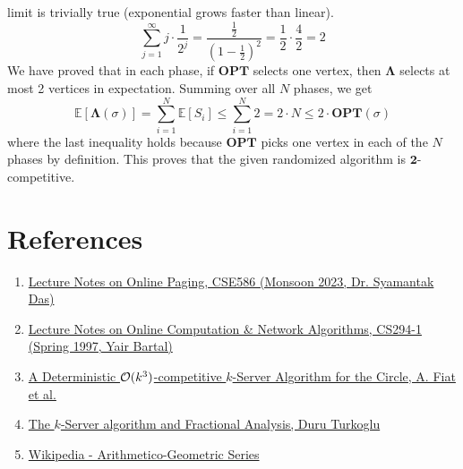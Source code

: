 \documentclass[11pt]{article}
\newcommand{\bigO}{{\cal O}}
\begin{document}
limit is trivially true (exponential grows faster than linear). \\
\begin{equation}
    \label{eq:ags}
    \sum_{j=1}^{\infty} j \cdot \frac{1}{2^{j}} = \frac{\frac{1}{2}}{(1 - \frac{1}{2})^{2}} = \frac{1}{2} \cdot \frac{4}{2} = 2
\end{equation}
We have proved that in each phase, if $\mathbf{OPT}$ selects one vertex, then $\mathbf{\Lambda}$ selects at most 2 vertices
in expectation. Summing over all $N$ phases, we get
\begin{equation}
    \mathbb{E}[\mathbf{\Lambda}(\sigma)] = \sum_{i=1}^{N} \mathbb{E}[S_{i}] \leq \sum_{i=1}^{N} 2 = 2 \cdot N \leq 2 \cdot \mathbf{OPT}(\sigma)
\end{equation}
where the last inequality holds because $\mathbf{OPT}$ picks one vertex in each of the $N$ phases by definition. This proves that the given randomized
algorithm is $\mathbf{2}$-competitive.


\section*{References}
\begin{enumerate}
    \item \href{https://drive.google.com/file/d/1XNEFcQVAwPxwWcIc7JNnV_KkknwTE8le/view}{Lecture Notes on Online Paging, CSE586 (Monsoon 2023, Dr. Syamantak Das)}
    \item \href{https://drive.google.com/file/d/1oiCLx6IrV6MFVn__o1-i53MMMUvXgmof/view}{Lecture Notes on Online Computation \& Network Algorithms, CS294-1 (Spring 1997, Yair Bartal)}
    \item \href{https://sci-hub.se/https://link.springer.com/article/10.1007/BF01189994}{A Deterministic $\bigO(k^{3})$-competitive $k$-Server Algorithm for the Circle, A. Fiat et al.}
    \item \href{https://people.cs.uchicago.edu/~duru/papers/masters.pdf}{The $k$-Server algorithm and Fractional Analysis, Duru Turkoglu}
    \item \href{https://en.wikipedia.org/wiki/Arithmetico-geometric_sequence}{Wikipedia - Arithmetico-Geometric Series}
\end{enumerate}
\end{document}
